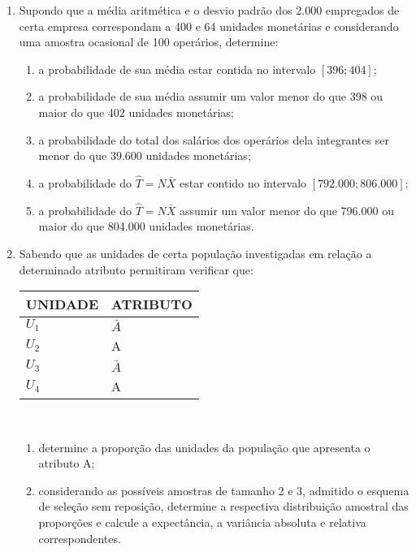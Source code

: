 \begin{enumerate}[resume]
\item Supondo que a média aritmética e o desvio padrão dos 2.000 empregados de certa empresa correspondam a 400 e 64 unidades monetárias e considerando uma amostra ocasional de 100 operários, determine:
	\begin{enumerate}
	\item a probabilidade de sua média estar contida no intervalo $[396 ; 404]$;
	\item a probabilidade de sua média assumir um valor menor do que 398 ou maior do que 402 unidades monetárias;
	\item a probabilidade do total dos salários dos operários dela integrantes ser menor do que 39.600 unidades monetárias;
	\item a probabilidade do $\hat{T} = N\bar{X}$ estar contido no intervalo $[792.000 ; 806.000]$;
	\item a probabilidade do $\hat{T} = N\bar{X}$ assumir um valor menor do que 796.000 ou maior do que 804.000 unidades monetárias.
	\end{enumerate}

\item Sabendo que as unidades de certa população investigadas em relação a determinado atributo permitiram verificar que:
	\begin{table}[!htb]
	\centering
	\vspace{0.5cm}
	\begin{tabular}{ll}
	UNIDADE & ATRIBUTO \\
	\hline 
	$U_{1}$ & $\bar{A}$ \\
	$U_{2}$ & A \\
	$U_{3}$ & $\bar{A}$ \\
	$U_{4}$ & A \\
	\end{tabular}
	\end{table} \\	
	\begin{enumerate}
	\item determine a proporção das unidades da população que apresenta o atributo A;
	\item considerando as possíveis amostras de tamanho 2 e 3, admitido o esquema de seleção sem reposição, determine a respectiva distribuição amostral das proporções e calcule a expectância, a variância absoluta e relativa correspondentes.
	\end{enumerate}
	

\end{enumerate}
